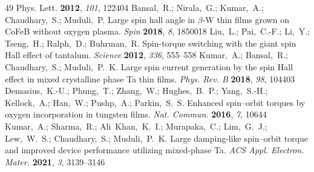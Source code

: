 \documentclass[journal=jacsat,manuscript=article]{achemso}
\begin{document}
\begin{mcitethebibliography}{49}
{  Phys. Lett.} \textbf{2012}, \emph{101}, 122404\relax
\mciteBstWouldAddEndPuncttrue
\mciteSetBstMidEndSepPunct{\mcitedefaultmidpunct}
{\mcitedefaultendpunct}{\mcitedefaultseppunct}\relax
\EndOfBibitem
{}
Bansal,~R.; Nirala,~G.; Kumar,~A.; Chaudhary,~S.; Muduli,~P. Large spin hall
  angle in $\beta$-W thin films grown on CoFeB without oxygen plasma.
  \emph{Spin} \textbf{2018}, \emph{8}, 1850018\relax
\mciteBstWouldAddEndPuncttrue
\mciteSetBstMidEndSepPunct{\mcitedefaultmidpunct}
{\mcitedefaultendpunct}{\mcitedefaultseppunct}\relax
\EndOfBibitem
{}
Liu,~L.; Pai,~C.-F.; Li,~Y.; Tseng,~H.; Ralph,~D.; Buhrman,~R. Spin-torque
  switching with the giant spin Hall effect of tantalum. \emph{Science}
  \textbf{2012}, \emph{336}, 555--558\relax
\mciteBstWouldAddEndPuncttrue
\mciteSetBstMidEndSepPunct{\mcitedefaultmidpunct}
{\mcitedefaultendpunct}{\mcitedefaultseppunct}\relax
\EndOfBibitem
{}
Kumar,~A.; Bansal,~R.; Chaudhary,~S.; Muduli,~P.~K. Large spin current
  generation by the spin Hall effect in mixed crystalline phase Ta thin films.
  \emph{Phys. Rev. B} \textbf{2018}, \emph{98}, 104403\relax
\mciteBstWouldAddEndPuncttrue
\mciteSetBstMidEndSepPunct{\mcitedefaultmidpunct}
{\mcitedefaultendpunct}{\mcitedefaultseppunct}\relax
\EndOfBibitem
{}
Demasius,~K.-U.; Phung,~T.; Zhang,~W.; Hughes,~B.~P.; Yang,~S.-H.; Kellock,~A.;
  Han,~W.; Pushp,~A.; Parkin,~S.~S. Enhanced spin--orbit torques by oxygen
  incorporation in tungsten films. \emph{Nat. Commun.} \textbf{2016}, \emph{7},
  10644\relax
\mciteBstWouldAddEndPuncttrue
\mciteSetBstMidEndSepPunct{\mcitedefaultmidpunct}
{\mcitedefaultendpunct}{\mcitedefaultseppunct}\relax
\EndOfBibitem
{}
Kumar,~A.; Sharma,~R.; Ali~Khan,~K.~I.; Murapaka,~C.; Lim,~G.~J.; Lew,~W.~S.;
  Chaudhary,~S.; Muduli,~P.~K. Large damping-like spin--orbit torque and
  improved device performance utilizing mixed-phase Ta. \emph{ACS Appl.
  Electron. Mater.} \textbf{2021}, \emph{3}, 3139--3146\relax
\mciteBstWouldAddEndPuncttrue
\mciteSetBstMidEndSepPunct{\mcitedefaultmidpunct}
{\mcitedefaultendpunct}{\mcitedefaultseppunct}\relax
\EndOfBibitem

\end{mcitethebibliography}
\end{document}
